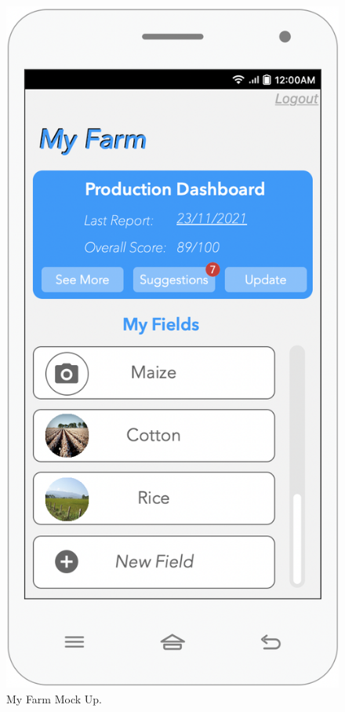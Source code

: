 \begin{multicols}{3}
\begin{figure}[H]
\centering
\includegraphics[scale=0.35]{../images_diagrams/mock_ups/myfarm100.png}
\caption{\label{fig:mock_farm}My Farm Mock Up.}
\end{figure}



\end{multicols}
